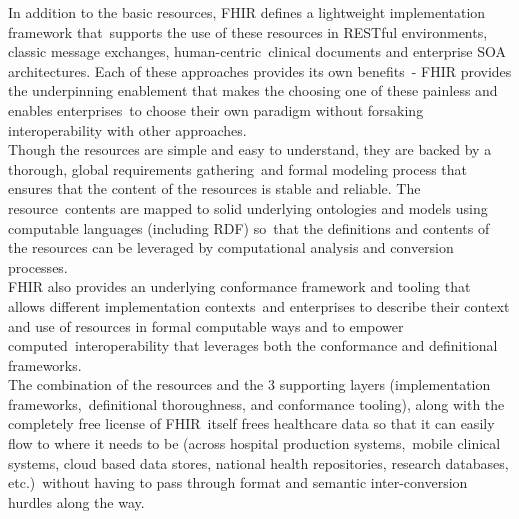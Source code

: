   \noindent In addition to the basic resources, FHIR defines a lightweight implementation framework that\
  supports the use of these resources in RESTful environments, classic message exchanges, human-centric\
  clinical documents and enterprise SOA architectures. Each of these approaches provides its own benefits\ 
  - FHIR provides the underpinning enablement that makes the choosing one of these painless and enables enterprises\
  to choose their own paradigm without forsaking interoperability with other approaches.\\

  \noindent Though the resources are simple and easy to understand, they are backed by a thorough, global requirements gathering\
  and formal modeling process that ensures that the content of the resources is stable and reliable. The resource\
  contents are mapped to solid underlying ontologies and models using computable languages (including RDF) so\
  that the definitions and contents of the resources can be leveraged by computational analysis and conversion processes.\\

  \noindent FHIR also provides an underlying conformance framework and tooling that allows different implementation contexts\ 
  and enterprises to describe their context and use of resources in formal computable ways and to empower computed\
  interoperability that leverages both the conformance and definitional frameworks.\\

  \noindent The combination of the resources and the 3 supporting layers (implementation frameworks,\
  definitional thoroughness, and conformance tooling), along with the completely free license of FHIR\
  itself frees healthcare data so that it can easily flow to where it needs to be (across hospital production systems,\
  mobile clinical systems, cloud based data stores, national health repositories, research databases, etc.)\
  without having to pass through format and semantic inter-conversion hurdles along the way. \citep{_fhir_framework_2013}\
